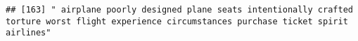 \documentclass[
]{article}
\begin{document}
\begin{verbatim}
## [163] " airplane poorly designed plane seats intentionally crafted torture worst flight experience circumstances purchase ticket spirit airlines"                                                                                                                                                                                                                                                                                                                                                                                                                                                                                                                                                                                                                                                                                                                                                                                                                                                                                                                                                                                                                                                                                                                                                                                                                                                                                                                                                                                                                                                                                                                                                                                                                                                     

\end{verbatim}
\end{document}
